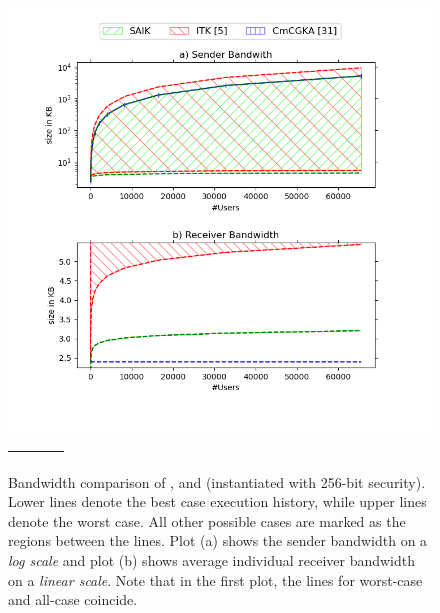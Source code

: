 \begin{figure}[!t]
\begin{minipage}[t]{.48\textwidth}
	\begin{minipage}[t]{\linewidth}\includegraphics[width=\linewidth]{../plots/Final_Figures_Avg}\end{minipage}\vspace*{-1cm}
	\caption{Bandwidth comparison of \saik, \protITK and \protCMPKE (instantiated with 256-bit
		security). Lower lines denote the best case execution history, while upper lines denote the
		worst case. All other possible cases are marked as the regions between the lines. Plot (a) shows the sender bandwidth on a \emph{log scale} and plot
		(b) shows average individual receiver bandwidth on a \emph{linear scale}. Note that in the first plot, the lines for worst-case \saik and
		all-case \protCMPKE coincide.
	}
	\label{tab:plots}
  \end{minipage}
  \hfill
  \begin{minipage}[t]{.48\textwidth}
    \centering\vspace*{-8cm}
    \begin{minipage}[t]{\linewidth}
    	\begin{tabulary}{\linewidth}{|l|l|l|l|l|}
    		\hline
    		& \protITK & \saik & \protCMPKE \\
    		\hline

\end{tabulary}
\end{minipage}
\end{minipage}
\end{figure}
